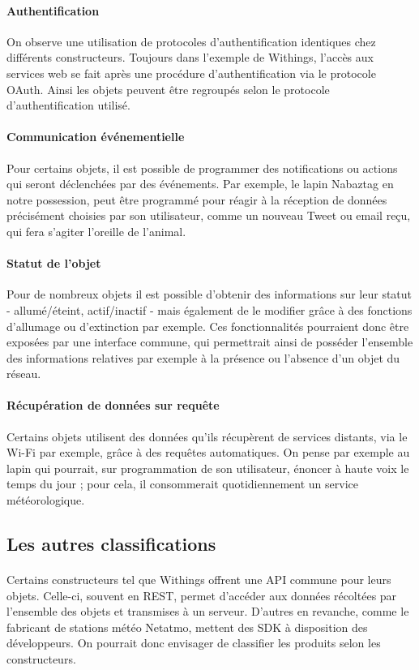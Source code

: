 \documentclass[nocopyrightspace]{sigplanconf}
\begin{document}
		\paragraph{Authentification}
		On observe une utilisation de protocoles d’authentification identiques chez différents constructeurs. Toujours dans l’exemple de Withings, l’accès aux services web se fait après une procédure d’authentification via le protocole OAuth. Ainsi les objets peuvent être regroupés selon le protocole d’authentification utilisé.

		\paragraph{Communication événementielle}
		Pour certains objets, il est possible de programmer des notifications ou actions qui seront déclen\-chées par des événements. Par exemple, le lapin Nabaztag en notre possession, peut être programmé pour réagir à la réception de données précisément choisies par son utilisateur, comme un nouveau Tweet ou email reçu, qui fera s’agiter l’oreille de l’animal.

		\paragraph{Statut de l’objet}
		Pour de nombreux objets il est possible d’obtenir des informations sur leur statut - allumé/éteint, actif/inactif - mais également de le modifier grâce à des fonctions d’allumage ou d’extinction par exemple. Ces fonctionnalités pourraient donc être exposées par une interface commune, qui permettrait ainsi de posséder l’ensemble des informations relatives par exemple à la présence ou l’absence d’un objet du réseau.

		\paragraph{Récupération de données sur requête}
		Certains objets utilisent des données qu’ils récupèrent de services distants, via le Wi-Fi par exemple, grâce à des requêtes automatiques. On pense par exemple au lapin qui pourrait, sur programmation de son utilisateur, énoncer à haute voix le temps du jour ; pour cela, il consommerait quotidiennement un service météorologique.

	\subsection{Les autres classifications}
		\paragraph{}
		Certains constructeurs tel que Withings offrent une API com\-mune\cite{withingsapi} pour leurs objets. Celle-ci, souvent en REST, permet d’accéder aux données récoltées par l’ensemble des objets et transmises à un serveur. D’autres en revanche, comme le fabricant de stations météo Netatmo\cite{netatmo}, mettent des SDK à disposition des développeurs. On pourrait donc envisager de classifier les produits selon les constructeurs.
\end{document}
